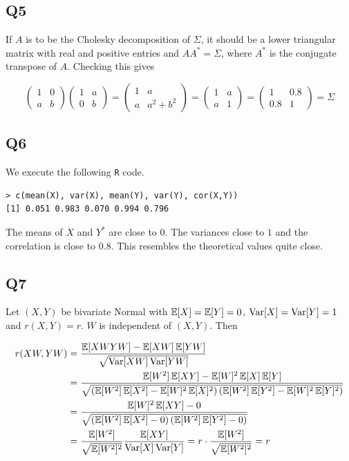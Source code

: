 \subsection*{Q5}
If $A$ is to be the Cholesky decomposition of $\Sigma$, it should be a lower triangular matrix with real and positive entries and $A A^* = \Sigma$, where $A^*$ is the conjugate transpose of $A$. Checking this gives

\begin{equation}
\begin{pmatrix}
1 & 0 \\
a & b
\end{pmatrix}
\begin{pmatrix}
1 & a \\
0 & b
\end{pmatrix}
=
\begin{pmatrix}
1 & a \\
a & a^2 + b^2
\end{pmatrix}
=
\begin{pmatrix}
1 & a \\
a & 1
\end{pmatrix}
=
\begin{pmatrix}
1 & 0.8 \\
0.8 & 1
\end{pmatrix}
= \Sigma
\end{equation}

\subsection*{Q6}
We execute the following \verb|R| code.
\begin{verbatim}
> c(mean(X), var(X), mean(Y), var(Y), cor(X,Y))
[1] 0.051 0.983 0.070 0.994 0.796
\end{verbatim}

The means of $X$ and $Y^*$ are close to $0$. The variances close to $1$ and the correlation is close to $0.8$. This resembles the theoretical values quite close.

\subsection*{Q7}
Let $(X, Y)$ be bivariate Normal with $\E[X] = \E[Y] = 0$, $\Var[X] = \Var[Y] = 1$ and $r(X,Y) = r$. $W$ is independent of $(X, Y)$. Then

\begin{align}
r(XW, YW) & = \frac{\E[XWYW] - \E[XW]\E[YW]}{\sqrt{\Var[XW] \Var[YW]}} \\
	      & = \frac{\E[W^2]\E[XY] - \E[W]^2\E[X]\E[Y]}{\sqrt{\left(\E[W^2]\E[X^2] - \E[W]^2\E[X]^2\right)\left(\E[W^2]\E[Y^2] - \E[W]^2\E[Y]^2\right)}} \\
	      & = \frac{\E[W]^2\E[XY] - 0}{\sqrt{\left(\E[W^2]\E[X^2] - 0\right)\left(\E[W^2]\E[Y^2] - 0\right)}} \\ 
	      & = \frac{\E[W^2]}{\sqrt{\E[W^2]^2}} \frac{\E[XY]}{\Var[X]\Var[Y]} = r \cdot \frac{\E[W^2]}{\sqrt{\E[W^2]^2}} = r
\end{align}

